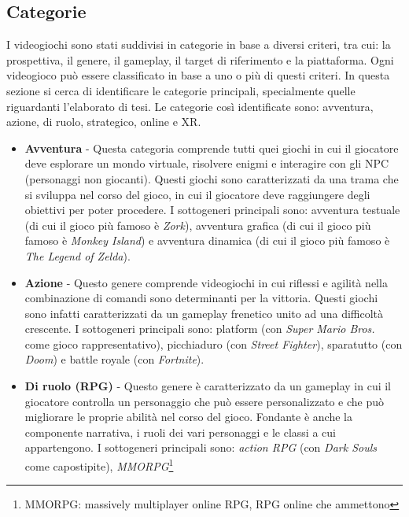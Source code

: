     \subsection{Categorie}\label{subsec:VideogiochiCategorie}
        I videogiochi sono stati suddivisi in categorie in base a diversi criteri, tra cui: la prospettiva, il genere, il gameplay, il target di riferimento e la piattaforma.
        Ogni videogioco può essere classificato in base a uno o più di questi criteri. In questa sezione si cerca di identificare le categorie principali, specialmente quelle riguardanti
        l'elaborato di tesi. Le categorie così identificate sono: avventura, azione, di ruolo, strategico, online e XR.\\
        \begin{itemize}
            \item \textbf{Avventura} - Questa categoria comprende tutti quei giochi in cui il giocatore deve esplorare un mondo virtuale, risolvere enigmi e interagire con gli NPC 
                (personaggi non giocanti). Questi giochi sono caratterizzati da una trama che si sviluppa nel corso del gioco, in cui il giocatore deve raggiungere degli obiettivi per 
                poter procedere. I sottogeneri principali sono: avventura testuale (di cui il gioco più famoso è \textit{Zork}), avventura grafica (di cui il gioco più famoso è
                \textit{Monkey Island}) e avventura dinamica (di cui il gioco più famoso è \textit{The Legend of Zelda}).
            \item \textbf{Azione} - Questo genere comprende videogiochi in cui riflessi e agilità nella combinazione di comandi sono determinanti per la vittoria. Questi giochi sono 
                infatti caratterizzati da un gameplay frenetico unito ad una difficoltà crescente. I sottogeneri principali sono: platform (con \textit{Super Mario Bros.} 
                come gioco rappresentativo), picchiaduro (con \textit{Street Fighter}), sparatutto (con \textit{Doom}) e battle royale (con \textit{Fortnite}).
            \item \textbf{Di ruolo (RPG)} - Questo genere è caratterizzato da un gameplay in cui il giocatore controlla un personaggio che può essere personalizzato e che può 
                migliorare le proprie abilità nel corso del gioco. Fondante è anche la componente narrativa, i ruoli dei vari personaggi e le classi a cui appartengono. I sottogeneri
                principali sono: \textit{action RPG} (con \textit{Dark Souls} come capostipite), \textit{MMORPG}\footnote{MMORPG: massively multiplayer online RPG, RPG online che ammettono
}
\end{itemize}
